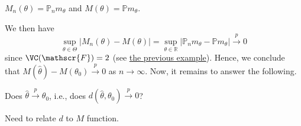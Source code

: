 \begin{notation}\label{not:M-estimation}
	\(M_n(\theta ) = \mathbb{P} _n m_\theta \) and \(M(\theta ) = \mathbb{P} m_\theta \).
\end{notation}

We then have
\[\sup _{\theta \in \Theta } \vert M_n(\theta ) - M(\theta ) \vert
	= \sup _{\theta \in \mathbb{R} }\vert \mathbb{P} _n m_\theta - \mathbb{P} m_\theta  \vert
	\overset{p}{\to } 0
\]
since \(\VC(\mathscr{F} ) = 2\) (see \hyperref[eg:VC-interval]{the previous example}). Hence, we conclude that \(M(\hat{\theta} ) - M(\theta _0) \overset{p}{\to } 0\) as \(n \to \infty \). Now, it remains to answer the following.

\begin{problem*}
	Does \(\hat{\theta} \overset{p}{\to} \theta _0\), i.e., does \(d(\hat{\theta} , \theta _0) \overset{p}{\to } 0\)?
\end{problem*}
\begin{answer}
	Need to relate \(d\) to \(M\) function.
\end{answer}